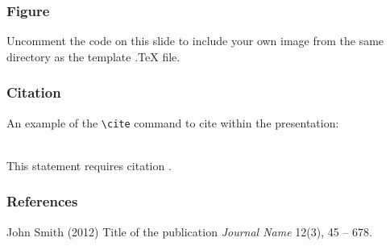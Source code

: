 \documentclass[10pt]{beamer}
\begin{document}

\begin{frame}
\frametitle{Figure}
Uncomment the code on this slide to include your own image from the same directory as the template .TeX file.
\end{frame}


\begin{frame}[fragile] %
\frametitle{Citation}
An example of the \verb|\cite| command to cite within the presentation:\\~

This statement requires citation \cite{p1}.
\end{frame}


\begin{frame}
\frametitle{References}
\footnotesize{
\begin{thebibliography}{99} %
 John Smith (2012)
\newblock Title of the publication
\newblock \emph{Journal Name} 12(3), 45 -- 678.
\end{thebibliography}
}
\end{frame}
\fi

\begin{frame}
\Huge{\centerline{}}
\end{frame}

\end{document}

